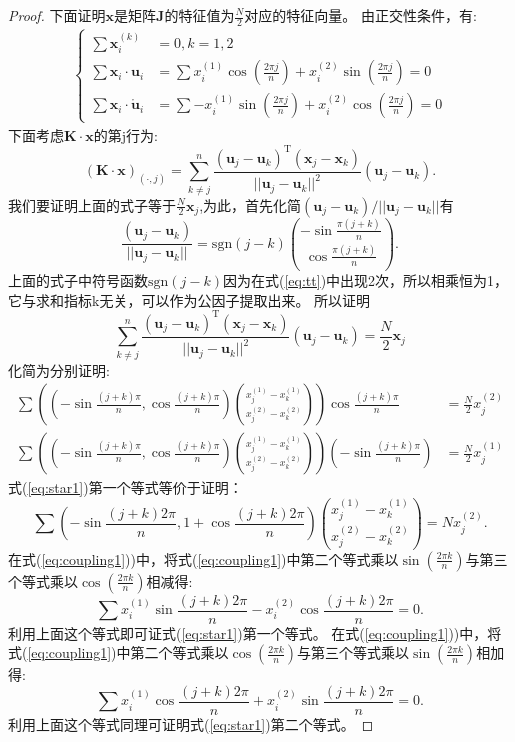 \begin{proof}
  下面证明$\bm{x}$是矩阵$\bm{J}$的特征值为$\frac{N}{2}$对应的特征向量。
  由正交性条件，有:
\begin{align}
\begin{cases}
\sum \bm{x}_i^{(k)}&=0,k=1,2\\
\sum \bm{x}_i \cdot \bm{u}_i&=\sum x_i^{(1)} \cos(\frac{2\pi j}{n})+x_i^{(2)} \sin(\frac{2\pi j}{n})=0
\label{eq:coupling1}\\
\sum \bm{x}_i \cdot \mathring{\bm{u}}_i &=\sum -x_i^{(1)} \sin(\frac{2\pi j}{n})+x_i^{(2)} \cos(\frac{2\pi j}{n}) =0
\end{cases}
\end{align}
下面考虑$\bm{K}\cdot \bm{x}$的第j行为:
\begin{equation}\label{eq:tt}
\left(\bm{K}\cdot \bm{x}\right)_{(\cdot,j)}=\sum_{k\neq j}^n \frac{(\bm{u}_j-\bm{u}_k)^{\textrm{T}} (\bm{x}_j-\bm{x}_k)}{||\bm{u}_j-\bm{u}_k||^2}(\bm{u}_j-\bm{u}_k).
\end{equation}
我们要证明上面的式子等于$\frac{N}{2}\bm{x}_j$,为此，首先化简$(\bm{u}_j-\bm{u}_k)/||\bm{u}_j-\bm{u}_k||$有
\begin{equation}
\frac{(\bm{u}_j-\bm{u}_k)}{||\bm{u}_j-\bm{u}_k||}=\text{sgn}(j-k)\binom{-\sin\frac{\pi(j+k)}{n}}{\cos\frac{\pi(j+k)}{n}}.
\end{equation}
上面的式子中符号函数$\text{sgn}(j-k)$因为在式(\ref{eq:tt})中出现2次，所以相乘恒为1，它与求和指标k无关，可以作为公因子提取出来。
所以证明\begin{equation}
\sum_{k\neq j}^n \frac{(\bm{u}_j-\bm{u}_k)^{\textrm{T}} (\bm{x}_j-\bm{x}_k)}{||\bm{u}_j-\bm{u}_k||^2}(\bm{u}_j-\bm{u}_k)=\frac{N}{2}\bm{x}_j
\end{equation}
化简为分别证明:
\begin{align*}\label{eq:star1}
\sum ((-\sin\frac{(j+k)\pi}{n},\cos\frac{(j+k)\pi}{n})\binom{x_j^{(1)}-x_k^{(1)}}{x_j^{(2)}-x_k^{(2)}})
\cos\frac{(j+k)\pi}{n}&=\frac{N}{2}x_j^{(2)}\\
\sum ((-\sin\frac{(j+k)\pi}{n},\cos\frac{(j+k)\pi}{n})\binom{x_j^{(1)}-x_k^{(1)}}{x_j^{(2)}-x_k^{(2)}})
(-\sin\frac{(j+k)\pi}{n})&=\frac{N}{2}x_j^{(1)}
\end{align*}
式(\ref{eq:star1})第一个等式等价于证明：
\begin{equation}
\sum (-\sin\frac{(j+k)2\pi}{n},1+\cos\frac{(j+k)2\pi}{n})\binom{x_j^{(1)}-x_k^{(1)}}{x_j^{(2)}-x_k^{(2)}}=Nx_j^{(2)}.
\end{equation}
在式(\ref{eq:coupling1}))中，将式(\ref{eq:coupling1})中第二个等式乘以$\sin(\frac{2\pi k}{n})$与第三个等式乘以$\cos(\frac{2\pi k}{n})$相减得:
\begin{equation}
\sum x_i^{(1)}\sin\frac{(j+k)2\pi}{n}-x_i^{(2)}\cos\frac{(j+k)2\pi}{n}=0.
\end{equation}
利用上面这个等式即可证式(\ref{eq:star1})第一个等式。
在式(\ref{eq:coupling1}))中，将式(\ref{eq:coupling1})中第二个等式乘以$\cos(\frac{2\pi k}{n})$与第三个等式乘以$\sin(\frac{2\pi k}{n})$相加得:
\begin{equation}
\sum x_i^{(1)}\cos\frac{(j+k)2\pi}{n}+x_i^{(2)}\sin\frac{(j+k)2\pi}{n}=0.
\end{equation}
利用上面这个等式同理可证明式(\ref{eq:star1})第二个等式。
\end{proof}
